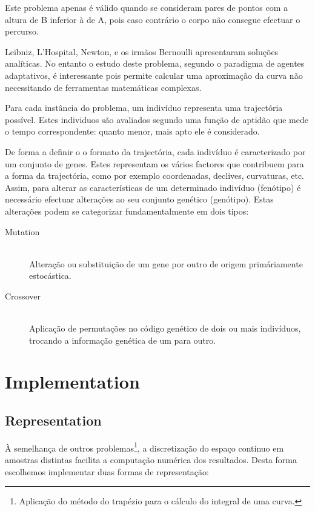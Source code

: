 \documentclass[a4paper]{article}
\begin{document}
\indent Este problema apenas é válido quando se consideram pares de pontos com a altura de B inferior à de A, pois caso contrário o corpo não consegue efectuar o percurso.

Leibniz, L'Hospital, Newton, e os irmãos Bernoulli apresentaram soluções analíticas.
No entanto o estudo deste problema, segundo o paradigma de agentes adaptativos, é interessante pois permite calcular uma aproximação da curva
não necessitando de ferramentas matemáticas complexas.

\indent Para cada instância do problema, um indivíduo representa uma trajectória possível. Estes individuos são avaliados segundo uma
função de aptidão que mede o tempo correspondente: quanto menor, mais apto ele é considerado.

\indent De forma a definir o o formato da trajectória, cada indivíduo é caracterizado por um conjunto de genes. Estes representam os vários
factores que contribuem para a forma da trajectória, como por exemplo coordenadas, declives, curvaturas, etc. Assim, para alterar as características
de um determinado indivíduo (fenótipo) é necessário efectuar alterações ao seu conjunto genético (genótipo). Estas alterações podem se categorizar
fundamentalmente em dois tipos:

\begin{description}
	\item[Mutation] \hfill \\ 
		Alteração ou substituição de um gene por outro de origem primáriamente estocástica.
	\item[Crossover] \hfill \\ 
		Aplicação de permutações no código genético de dois ou mais indivíduos, trocando a informação genética de um para outro.
\end{description}

\cleardoublepage
\section{Implementation}

\subsection{Representation}
\indent \indent À semelhança de outros problemas\footnote[1]{Aplicação do método do trapézio para o cálculo do integral de uma curva.}, a discretização do espaço contínuo em amostras
distintas facilita a computação numérica dos resultados. Desta forma escolhemos implementar duas formas de representação:
\end{document}
